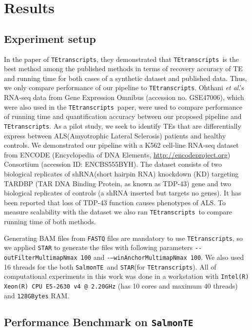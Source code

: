 \documentclass{ws-procs11x85}
\newcommand{\etal}{\textit{et al}.}
\newcommand{\TEtranscripts}{\texttt{TEtranscripts}}
\newcommand{\SalmonTE}{\texttt{SalmonTE}}
\begin{document}
\section{Results}

\subsection{Experiment setup}
In the paper of \TEtranscripts, they demonstrated that \TEtranscripts~is the best method among the published methods in terms of recovery accuracy of TE and running time for both cases of a synthetic dataset and published data. 
Thus, we only compare performance of our pipeline to \TEtranscripts. 
Ohthani \etal's RNA-seq data from Gene Expression Omnibus (accession no. GSE47006), which were also used in the \TEtranscripts~paper, 
were used to compare performance of running time and quantification accuracy between
our proposed pipeline and \TEtranscripts. \cite{ohtani2013dmgtsf1}
As a pilot study, we seek to identify TEs that are  differentially express between ALS(Amyotrophic Lateral Sclerosis)  patients and healthy  controls.
We demonstrated our pipeline with a K562 cell-line RNA-seq dataset from ENCODE (Encyclopedia of DNA Elements, \url{http://encodeproject.org}) \cite{encode2012integrated} Consortium (accession ID: ENCBS555BYH). 
The dataset consists of two biological replicates of shRNA(short hairpin RNA) knockdown (KD)
targeting TARDBP (TAR DNA Binding Protein, as known as TDP-43) gene and two biological replicates of controls 
(a shRNA inserted but targets no genes). 
It has been reported that loss of TDP-43 function causes phenotypes of 
ALS.\cite{yang2014partial,mihevc2016tdp} To measure scalability with the dataset
we also ran \TEtranscripts~to compare running time of both methods.


Generating BAM files from \verb|FASTQ| files are mandatory to use \TEtranscripts, so we applied \verb|STAR|\cite{dobin2013star} to generate the files with following parameters
\verb|--outFilterMultimapNmax 100| and \verb|-–winAnchorMultimapNmax 100|. We also used 16 threads for the both \SalmonTE~and \verb|STAR|(for \TEtranscripts).
All of computational experiments in this work was done in a workstation with 
\verb|Intel(R) Xeon(R) CPU E5-2630 v4 @ 2.20GHz| (has 10 cores and maximum 40 threads) and \verb|128GBytes| RAM.


\subsection{Performance Benchmark on \SalmonTE}
\end{document}
